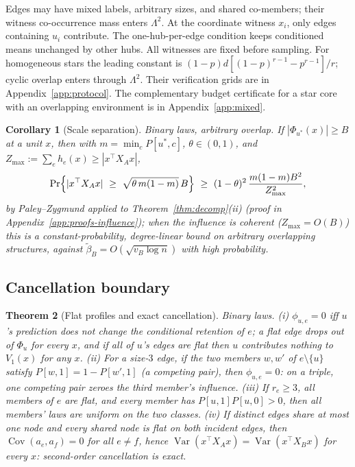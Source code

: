 \documentclass[preprint,11pt]{elsarticle}
\newtheorem{theorem}{Theorem}[section]
\newtheorem{corollary}[theorem]{Corollary}
\begin{document}
Edges may have mixed labels, arbitrary sizes, and shared co-members;
their witness co-occurrence mass enters $\Lambda^2$. At the coordinate
witness $x_i$, only edges containing $u_i$ contribute. The one-hub-per-edge
condition keeps conditioned means unchanged by other hubs. All witnesses
are fixed before sampling.
For homogeneous stars the leading constant is
$(1-p)d[(1-p)^{r-1}-p^{r-1}]/r$; cyclic overlap enters through
$\Lambda^2$. Their verification grids are in
Appendix~\ref{app:protocol}. The complementary budget certificate
for a star core with an overlapping environment is in
Appendix~\ref{app:mixed}.

\begin{corollary}[Scale separation]\label{cor:scale}
Binary laws, arbitrary overlap. If $|\Phi_{u^\ast}(x)|\ge B$ at a unit
$x$, then with $m=\min_cP[u^\ast,c]$, $\theta\in(0,1)$, and
$Z_{\max}:=\sum_eh_e(x)\ge|x^\top X_Ax|$,
\[
\Pr\Bigl\{|x^\top X_Ax|\ \ge\ \sqrt{\theta\,m(1-m)}\,B\Bigr\}
\ \ge\ (1-\theta)^2\,\frac{m(1-m)B^2}{Z_{\max}^2},
\]
by Paley--Zygmund applied to Theorem~\ref{thm:decomp}(ii) (proof in
Appendix~\ref{app:proofs-influence}); when the influence is coherent
($Z_{\max}=O(B)$) this is a constant-probability, degree-linear bound
on arbitrary overlapping structures, against
$\widetilde\beta_B=O(\sqrt{v_B\log n})$ with high probability.
\end{corollary}

\subsection{Cancellation boundary}\label{sec:cancel}

\begin{theorem}[Flat profiles and exact cancellation]\label{thm:cancel}
Binary laws. (i) $\phi_{u,e}=0$ iff $u$'s prediction does not change
the conditional retention of $e$; a flat edge drops out of $\Phi_u$
for every $x$, and if all of $u$'s edges are flat then $u$ contributes
nothing to $V_1(x)$ for any $x$. (ii) For a size-$3$ edge, if the two
members
$w,w'$ of $e\setminus\{u\}$ satisfy $P[w,1]=1-P[w',1]$ (a competing
pair), then $\phi_{u,e}=0$: on a triple, one competing pair zeroes
the third member's influence. (iii) If $r_e\ge3$, all members of $e$
are flat, and every member has $P[u,1]P[u,0]>0$, then all members'
laws are uniform on the two classes. (iv) If distinct edges share at
most one node and every shared node is flat on both incident edges,
then $\operatorname{Cov}(a_e,a_f)=0$ for all $e\ne f$, hence
$\operatorname{Var}(x^\top X_Ax)=\operatorname{Var}(x^\top X_Bx)$
\emph{for every} $x$: second-order cancellation is exact.
\end{theorem}
\end{document}
